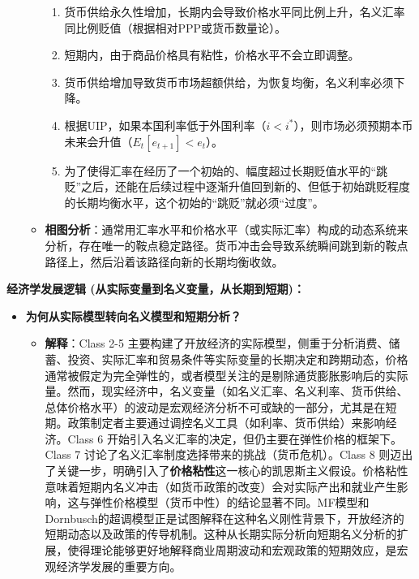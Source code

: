 \documentclass[12pt]{article}
\begin{document}
\begin{itemize}
\begin{itemize}
        \begin{enumerate}
            \item 货币供给永久性增加，长期内会导致价格水平同比例上升，名义汇率同比例贬值（根据相对PPP或货币数量论）。
            \item 短期内，由于商品价格具有粘性，价格水平不会立即调整。
            \item 货币供给增加导致货币市场超额供给，为恢复均衡，名义利率必须下降。
            \item 根据UIP，如果本国利率低于外国利率（$i < i^*$），则市场必须预期本币未来会升值（$E_t[e_{t+1}] < e_t$）。
            \item 为了使得汇率在经历了一个初始的、幅度超过长期贬值水平的“跳贬”之后，还能在后续过程中逐渐升值回到新的、但低于初始跳贬程度的长期均衡水平，这个初始的“跳贬”就必须“过度”。
        \end{enumerate}
        \item \textbf{相图分析}：通常用汇率水平和价格水平（或实际汇率）构成的动态系统来分析，存在唯一的鞍点稳定路径。货币冲击会导致系统瞬间跳到新的鞍点路径上，然后沿着该路径向新的长期均衡收敛。
    \end{itemize}
\end{itemize}

\textbf{经济学发展逻辑 (从实际变量到名义变量，从长期到短期)：}
\begin{itemize}
    \item \textbf{为何从实际模型转向名义模型和短期分析？}
    \begin{itemize}
        \item \textbf{解释}：Class 2-5 主要构建了开放经济的实际模型，侧重于分析消费、储蓄、投资、实际汇率和贸易条件等实际变量的长期决定和跨期动态，价格通常被假定为完全弹性的，或者模型关注的是剔除通货膨胀影响后的实际量。然而，现实经济中，名义变量（如名义汇率、名义利率、货币供给、总体价格水平）的波动是宏观经济分析不可或缺的一部分，尤其是在短期。政策制定者主要通过调控名义工具（如利率、货币供给）来影响经济。Class 6 开始引入名义汇率的决定，但仍主要在弹性价格的框架下。Class 7 讨论了名义汇率制度选择带来的挑战（货币危机）。Class 8 则迈出了关键一步，明确引入了\textbf{价格粘性}这一核心的凯恩斯主义假设。价格粘性意味着短期内名义冲击（如货币政策的改变）会对实际产出和就业产生影响，这与弹性价格模型（货币中性）的结论显著不同。MF模型和Dornbusch的超调模型正是试图解释在这种名义刚性背景下，开放经济的短期动态以及政策的传导机制。这种从长期实际分析向短期名义分析的扩展，使得理论能够更好地解释商业周期波动和宏观政策的短期效应，是宏观经济学发展的重要方向。
    \end{itemize}
\end{itemize}
\end{document}
